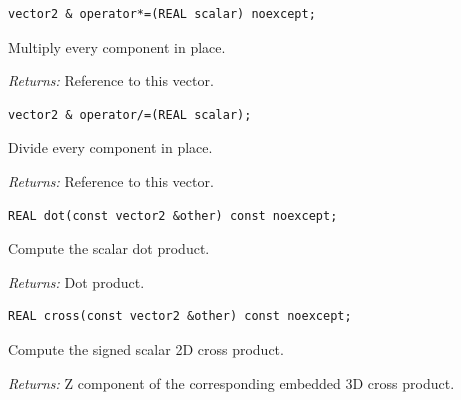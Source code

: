 \par\noindent\begin{minipage}{\linewidth}
\begin{lstlisting}[style=apireference]
vector2 & operator*=(REAL scalar) noexcept;
\end{lstlisting}
{\footnotesize Multiply every component in place.\par}
{\footnotesize\textit{Returns:} Reference to this vector.\par}
\end{minipage}\par\vspace{1pt}
\par\noindent\begin{minipage}{\linewidth}
\begin{lstlisting}[style=apireference]
vector2 & operator/=(REAL scalar);
\end{lstlisting}
{\footnotesize Divide every component in place.\par}
{\footnotesize\textit{Returns:} Reference to this vector.\par}
\end{minipage}\par\vspace{1pt}
\par\noindent\begin{minipage}{\linewidth}
\begin{lstlisting}[style=apireference]
REAL dot(const vector2 &other) const noexcept;
\end{lstlisting}
{\footnotesize Compute the scalar dot product.\par}
{\footnotesize\textit{Returns:} Dot product.\par}
\end{minipage}\par\vspace{1pt}
\par\noindent\begin{minipage}{\linewidth}
\begin{lstlisting}[style=apireference]
REAL cross(const vector2 &other) const noexcept;
\end{lstlisting}
{\footnotesize Compute the signed scalar 2D cross product.\par}
{\footnotesize\textit{Returns:} Z component of the corresponding embedded 3D cross product.\par}
\end{minipage}\par\vspace{1pt}
